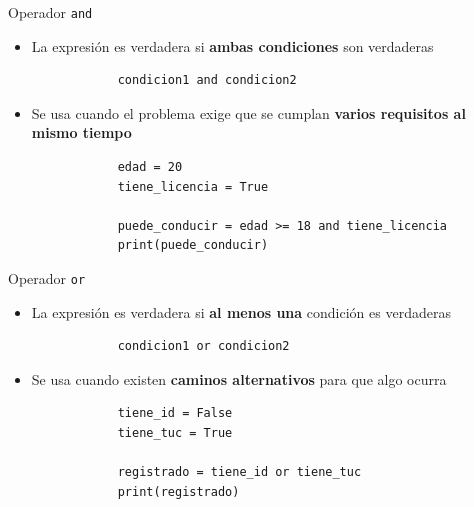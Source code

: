 \documentclass{beamer}
\begin{document}
    \begin{frame}[fragile,t]{Operador \texttt{and}}
        \begin{itemize}
            \item La expresión es verdadera si \textbf{ambas condiciones} son verdaderas
            \begin{verbatim}
            condicion1 and condicion2
            \end{verbatim}
            \item Se usa cuando el problema exige que se cumplan \textbf{varios requisitos al mismo tiempo}
            \begin{verbatim}
            edad = 20
            tiene_licencia = True

            puede_conducir = edad >= 18 and tiene_licencia
            print(puede_conducir)
            \end{verbatim}
        \end{itemize}
    \end{frame}

    \begin{frame}[fragile,t]{Operador \texttt{or}}
        \begin{itemize}
            \item La expresión es verdadera si \textbf{al menos una} condición es verdaderas
            \begin{verbatim}
            condicion1 or condicion2
            \end{verbatim}
            \item Se usa cuando existen \textbf{caminos alternativos} para que algo ocurra
            \begin{verbatim}
            tiene_id = False
            tiene_tuc = True
            
            registrado = tiene_id or tiene_tuc
            print(registrado)
            \end{verbatim}
        \end{itemize}
    \end{frame}
\end{document}
